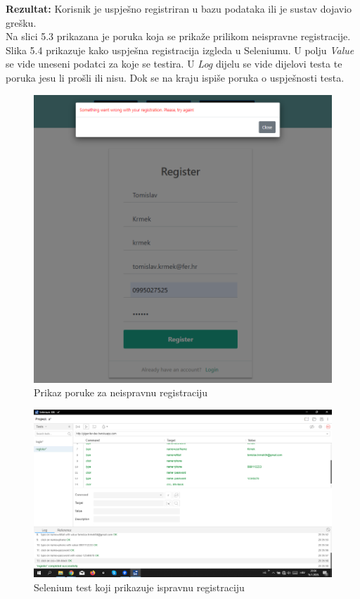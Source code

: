 		 		
		 		\noindent\textbf{Rezultat:} Korisnik je uspješno registriran u bazu podataka ili je sustav dojavio grešku.\\
		 		
		 		
		 		Na slici 5.3 prikazana je poruka koja se prikaže prilikom neispravne registracije. Slika 5.4 prikazuje kako uspješna registracija izgleda u Seleniumu. U polju \textit{Value} se vide uneseni podatci za koje se testira. U \textit{Log} dijelu se vide dijelovi testa te poruka jesu li prošli ili nisu. Dok se na kraju ispiše poruka o uspješnosti testa.  
		 		
				\begin{figure}[H]
		 			\begin{center}
		 				\includegraphics[width=15cm]{slike/neispravna_forma_registracija.PNG}
		 			\end{center}
		 			\caption{Prikaz poruke za neispravnu registraciju}
		 			\label{fig:inttest}
		 		\end{figure}
	 		
	 			\begin{figure}[H]
	 				\begin{center}
	 					\includegraphics[width=15cm]{slike/selenium_register.PNG}
	 				\end{center}
	 				\caption{Selenium test koji prikazuje ispravnu registraciju}
	 				\label{fig:selreg}
	 			\end{figure}
 			
